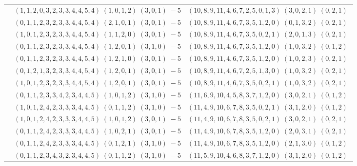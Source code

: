 \documentclass[11pt]{article}
\begin{document}
\begin{longtable}[l]{|c|c|c|}
 \cline{2-3} 
 & $(1 ,1 ,2 ,0 ,3 ,2 ,3 ,3 ,4 ,4 ,5 ,4) \;(1 ,0 ,1 ,2) \;(3 ,0 ,1) \;-5$ & $(10 ,8 ,9 ,11 ,4 ,6 ,7 ,2 ,5 ,0 ,1 ,3) \;(3 ,0 ,2 ,1) \;(0 ,2 ,1) \;$\\ 
 \cline{2-3} 
 & $(0 ,1 ,1 ,2 ,3 ,2 ,3 ,3 ,4 ,4 ,5 ,4) \;(2 ,1 ,0 ,1) \;(3 ,0 ,1) \;-5$ & $(10 ,8 ,9 ,11 ,4 ,6 ,7 ,3 ,5 ,1 ,2 ,0) \;(0 ,1 ,3 ,2) \;(0 ,2 ,1) \;$\\ 
 \cline{2-3} 
 & $(1 ,0 ,1 ,2 ,3 ,2 ,3 ,3 ,4 ,4 ,5 ,4) \;(1 ,1 ,2 ,0) \;(3 ,0 ,1) \;-5$ & $(10 ,8 ,9 ,11 ,4 ,6 ,7 ,3 ,5 ,0 ,2 ,1) \;(2 ,0 ,1 ,3) \;(0 ,2 ,1) \;$\\ 
 \cline{2-3} 
 & $(0 ,1 ,1 ,2 ,3 ,2 ,3 ,3 ,4 ,4 ,5 ,4) \;(1 ,2 ,0 ,1) \;(3 ,1 ,0) \;-5$ & $(10 ,8 ,9 ,11 ,4 ,6 ,7 ,3 ,5 ,1 ,2 ,0) \;(1 ,0 ,3 ,2) \;(0 ,1 ,2) \;$\\ 
 \cline{2-3} 
 & $(0 ,1 ,1 ,2 ,3 ,2 ,3 ,3 ,4 ,4 ,5 ,4) \;(1 ,2 ,1 ,0) \;(3 ,0 ,1) \;-5$ & $(10 ,8 ,9 ,11 ,4 ,6 ,7 ,3 ,5 ,1 ,2 ,0) \;(1 ,0 ,2 ,3) \;(0 ,2 ,1) \;$\\ 
 \cline{2-3} 
 & $(0 ,1 ,2 ,1 ,3 ,2 ,3 ,3 ,4 ,4 ,5 ,4) \;(1 ,2 ,0 ,1) \;(3 ,0 ,1) \;-5$ & $(10 ,8 ,9 ,11 ,4 ,6 ,7 ,2 ,5 ,1 ,3 ,0) \;(1 ,0 ,3 ,2) \;(0 ,2 ,1) \;$\\ 
 \cline{2-3} 
 & $(1 ,0 ,1 ,2 ,3 ,2 ,3 ,3 ,4 ,4 ,5 ,4) \;(1 ,2 ,0 ,1) \;(3 ,0 ,1) \;-5$ & $(10 ,8 ,9 ,11 ,4 ,6 ,7 ,3 ,5 ,0 ,2 ,1) \;(1 ,0 ,3 ,2) \;(0 ,2 ,1) \;$\\ 
 \cline{2-3} 
 & $(0 ,1 ,1 ,2 ,3 ,3 ,4 ,2 ,3 ,4 ,4 ,5) \;(1 ,0 ,1 ,2) \;(3 ,1 ,0) \;-5$ & $(11 ,6 ,9 ,10 ,4 ,5 ,8 ,3 ,7 ,1 ,2 ,0) \;(3 ,0 ,2 ,1) \;(0 ,1 ,2) \;$\\ 
 \cline{2-3} 
 & $(1 ,0 ,1 ,2 ,4 ,2 ,3 ,3 ,3 ,4 ,4 ,5) \;(0 ,1 ,1 ,2) \;(3 ,1 ,0) \;-5$ & $(11 ,4 ,9 ,10 ,6 ,7 ,8 ,3 ,5 ,0 ,2 ,1) \;(3 ,1 ,2 ,0) \;(0 ,1 ,2) \;$\\ 
 \cline{2-3} 
 & $(1 ,0 ,1 ,2 ,4 ,2 ,3 ,3 ,3 ,4 ,4 ,5) \;(1 ,0 ,1 ,2) \;(3 ,0 ,1) \;-5$ & $(11 ,4 ,9 ,10 ,6 ,7 ,8 ,3 ,5 ,0 ,2 ,1) \;(3 ,0 ,2 ,1) \;(0 ,2 ,1) \;$\\ 
 \cline{2-3} 
 & $(0 ,1 ,1 ,2 ,4 ,2 ,3 ,3 ,3 ,4 ,4 ,5) \;(1 ,0 ,2 ,1) \;(3 ,0 ,1) \;-5$ & $(11 ,4 ,9 ,10 ,6 ,7 ,8 ,3 ,5 ,1 ,2 ,0) \;(2 ,0 ,3 ,1) \;(0 ,2 ,1) \;$\\ 
 \cline{2-3} 
 & $(0 ,1 ,1 ,2 ,4 ,2 ,3 ,3 ,3 ,4 ,4 ,5) \;(0 ,1 ,2 ,1) \;(3 ,1 ,0) \;-5$ & $(11 ,4 ,9 ,10 ,6 ,7 ,8 ,3 ,5 ,1 ,2 ,0) \;(2 ,1 ,3 ,0) \;(0 ,1 ,2) \;$\\ 
 \cline{2-3} 
 & $(0 ,1 ,1 ,2 ,3 ,4 ,3 ,2 ,3 ,4 ,4 ,5) \;(0 ,1 ,1 ,2) \;(3 ,1 ,0) \;-5$ & $(11 ,5 ,9 ,10 ,4 ,6 ,8 ,3 ,7 ,1 ,2 ,0) \;(3 ,1 ,2 ,0) \;(0 ,1 ,2) \;$\\ 

\end{longtable}
\end{document}
